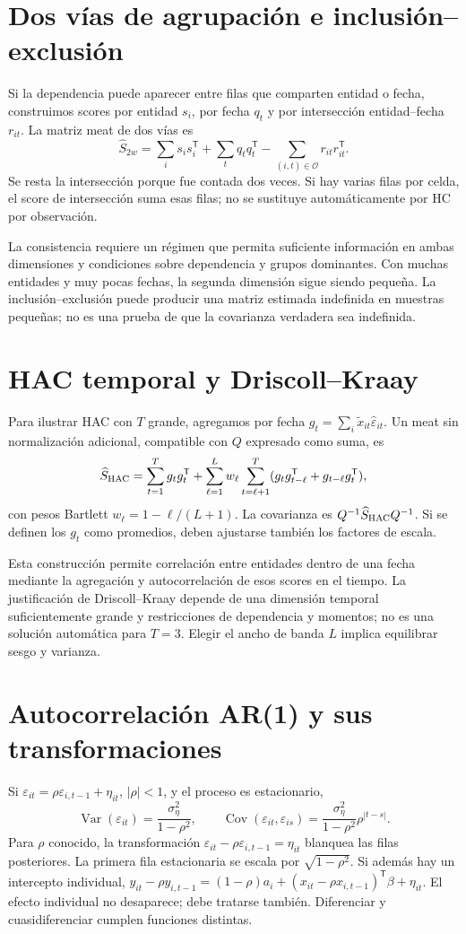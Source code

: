 \documentclass[11pt,a4paper]{article}
\newcommand{\T}{^{\mathsf T}}
\DeclareMathOperator{\Var}{Var}
\DeclareMathOperator{\Cov}{Cov}
\theoremstyle{definition}
\newcommand{\eps}{\varepsilon}
\newcommand{\cO}{\mathcal O}
\begin{document}
\section{Dos vías de agrupación e inclusión--exclusión}
Si la dependencia puede aparecer entre filas que comparten entidad o fecha, construimos scores por entidad $s_i$, por fecha $q_t$ y por intersección entidad--fecha $r_{it}$.
La matriz meat de dos vías es
\[
\widehat S_{2w}
=\sum_i s_is_i\T+\sum_tq_tq_t\T-\sum_{(i,t)\in\cO}r_{it}r_{it}\T.
\]
Se resta la intersección porque fue contada dos veces. Si hay varias filas por celda, el score de intersección suma esas filas; no se sustituye automáticamente por HC por observación.

La consistencia requiere un régimen que permita suficiente información en ambas dimensiones y condiciones sobre dependencia y grupos dominantes.
Con muchas entidades y muy pocas fechas, la segunda dimensión sigue siendo pequeña. La inclusión--exclusión puede producir una matriz estimada indefinida en muestras pequeñas; no es una prueba de que la covarianza verdadera sea indefinida.

\section{HAC temporal y Driscoll--Kraay}
Para ilustrar HAC con $T$ grande, agregamos por fecha
$g_t=\sum_i\widetilde x_{it}\widehat\eps_{it}$.
Un meat sin normalización adicional, compatible con $Q$ expresado como suma, es
\[
\widehat S_{\rm HAC}
=\sum_{t=1}^Tg_tg_t\T+
\sum_{\ell=1}^L w_\ell
\sum_{t=\ell+1}^T
(g_tg_{t-\ell}\T+g_{t-\ell}g_t\T),
\]
con pesos Bartlett $w_\ell=1-\ell/(L+1)$.
La covarianza es $Q^{-1}\widehat S_{\rm HAC}Q^{-1}$.
Si se definen los $g_t$ como promedios, deben ajustarse también los factores de escala.

Esta construcción permite correlación entre entidades dentro de una fecha mediante la agregación y autocorrelación de esos scores en el tiempo.
La justificación de Driscoll--Kraay depende de una dimensión temporal suficientemente grande y restricciones de dependencia y momentos; no es una solución automática para $T=3$. Elegir el ancho de banda $L$ implica equilibrar sesgo y varianza.

\section{Autocorrelación AR(1) y sus transformaciones}
Si $\eps_{it}=\rho\eps_{i,t-1}+\eta_{it}$, $|\rho|<1$, y el proceso es estacionario,
\[
\Var(\eps_{it})=\frac{\sigma_\eta^2}{1-\rho^2},
\qquad
\Cov(\eps_{it},\eps_{is})=
\frac{\sigma_\eta^2}{1-\rho^2}\rho^{|t-s|}.
\]
Para $\rho$ conocido, la transformación
$\eps_{it}-\rho\eps_{i,t-1}=\eta_{it}$ blanquea las filas posteriores.
La primera fila estacionaria se escala por $\sqrt{1-\rho^2}$.
Si además hay un intercepto individual,
$y_{it}-\rho y_{i,t-1}=(1-\rho)a_i+
(x_{it}-\rho x_{i,t-1})\T\beta+\eta_{it}$.
El efecto individual no desaparece; debe tratarse también. Diferenciar y cuasidiferenciar cumplen funciones distintas.
\end{document}
